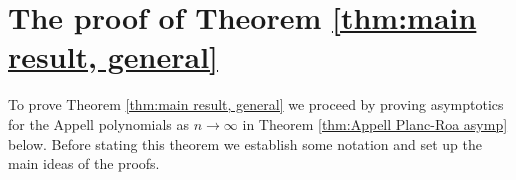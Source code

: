 \documentclass[reqno]{amsart}
\newcommand{\1}{\mathbf{1}}
\DeclareMathOperator{\He}{He}
\newcommand{\dd}{\mathrm{d}}
\theoremstyle{plain}
\theoremstyle{definition}
\theoremstyle{remark}
\numberwithin{equation}{section}
\begin{document}
%
%



\section{The proof of Theorem \ref{thm:main result, general}}\label{sec:proof} To prove Theorem \ref{thm:main result, general} we proceed by proving asymptotics for the Appell polynomials as $n\rightarrow\infty$ in Theorem \ref{thm:Appell Planc-Roa asymp} below. Before stating this theorem we establish some notation and set up the main ideas of the proofs. 
\end{document}
